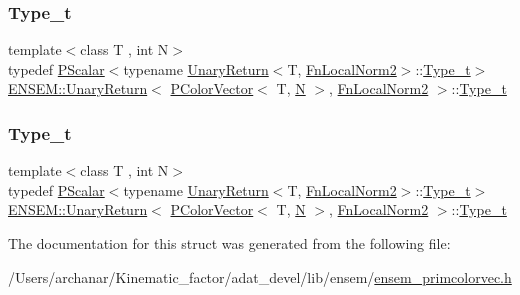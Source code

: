 \subsubsection{\texorpdfstring{Type\_t}{Type\_t}\hspace{0.1cm}{\footnotesize\ttfamily [1/2]}}
{\footnotesize\ttfamily template$<$class T , int N$>$ \\
typedef \mbox{\hyperlink{classENSEM_1_1PScalar}{P\+Scalar}}$<$typename \mbox{\hyperlink{structENSEM_1_1UnaryReturn}{Unary\+Return}}$<$T, \mbox{\hyperlink{structENSEM_1_1FnLocalNorm2}{Fn\+Local\+Norm2}}$>$\+::\mbox{\hyperlink{structENSEM_1_1UnaryReturn_3_01PColorVector_3_01T_00_01N_01_4_00_01FnLocalNorm2_01_4_ae0b040392de6e5320e94c74d9578abb8}{Type\+\_\+t}}$>$ \mbox{\hyperlink{structENSEM_1_1UnaryReturn}{E\+N\+S\+E\+M\+::\+Unary\+Return}}$<$ \mbox{\hyperlink{classENSEM_1_1PColorVector}{P\+Color\+Vector}}$<$ T, \mbox{\hyperlink{operator__name__util_8cc_a7722c8ecbb62d99aee7ce68b1752f337}{N}} $>$, \mbox{\hyperlink{structENSEM_1_1FnLocalNorm2}{Fn\+Local\+Norm2}} $>$\+::\mbox{\hyperlink{structENSEM_1_1UnaryReturn_3_01PColorVector_3_01T_00_01N_01_4_00_01FnLocalNorm2_01_4_ae0b040392de6e5320e94c74d9578abb8}{Type\+\_\+t}}}

\mbox{\label{structENSEM_1_1UnaryReturn_3_01PColorVector_3_01T_00_01N_01_4_00_01FnLocalNorm2_01_4_ae0b040392de6e5320e94c74d9578abb8}} 
\subsubsection{\texorpdfstring{Type\_t}{Type\_t}\hspace{0.1cm}{\footnotesize\ttfamily [2/2]}}
{\footnotesize\ttfamily template$<$class T , int N$>$ \\
typedef \mbox{\hyperlink{classENSEM_1_1PScalar}{P\+Scalar}}$<$typename \mbox{\hyperlink{structENSEM_1_1UnaryReturn}{Unary\+Return}}$<$T, \mbox{\hyperlink{structENSEM_1_1FnLocalNorm2}{Fn\+Local\+Norm2}}$>$\+::\mbox{\hyperlink{structENSEM_1_1UnaryReturn_3_01PColorVector_3_01T_00_01N_01_4_00_01FnLocalNorm2_01_4_ae0b040392de6e5320e94c74d9578abb8}{Type\+\_\+t}}$>$ \mbox{\hyperlink{structENSEM_1_1UnaryReturn}{E\+N\+S\+E\+M\+::\+Unary\+Return}}$<$ \mbox{\hyperlink{classENSEM_1_1PColorVector}{P\+Color\+Vector}}$<$ T, \mbox{\hyperlink{operator__name__util_8cc_a7722c8ecbb62d99aee7ce68b1752f337}{N}} $>$, \mbox{\hyperlink{structENSEM_1_1FnLocalNorm2}{Fn\+Local\+Norm2}} $>$\+::\mbox{\hyperlink{structENSEM_1_1UnaryReturn_3_01PColorVector_3_01T_00_01N_01_4_00_01FnLocalNorm2_01_4_ae0b040392de6e5320e94c74d9578abb8}{Type\+\_\+t}}}



The documentation for this struct was generated from the following file\+:\begin{DoxyCompactItemize}
\item 
/\+Users/archanar/\+Kinematic\+\_\+factor/adat\+\_\+devel/lib/ensem/\mbox{\hyperlink{lib_2ensem_2ensem__primcolorvec_8h}{ensem\+\_\+primcolorvec.\+h}}\end{DoxyCompactItemize}
